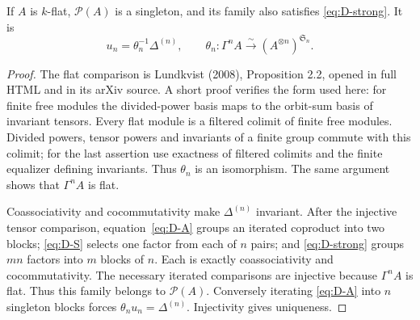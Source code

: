 \begin{theorem}
\label{sa08:D008}
If $A$ is $k$-flat, $\mathcal P(A)$ is a singleton, and its family
also satisfies \eqref{eq:D-strong}. It is
\[
 u_n=\theta_n^{-1}\Delta^{(n)},\qquad
 \theta_n:\Gamma^nA\xrightarrow{\sim}(A^{\otimes n})^{\mathfrak S_n}.
\]
\end{theorem}
\begin{proof}
The flat comparison is Lundkvist (2008), Proposition 2.2, opened
in full HTML and in its arXiv source. A short proof verifies the
form used here: for finite free modules the divided-power basis
maps to the orbit-sum basis of invariant tensors. Every flat
module is a filtered colimit of finite free modules. Divided powers,
tensor powers and invariants of a finite group commute with this
colimit; for the last assertion use exactness of filtered colimits
and the finite equalizer defining invariants. Thus $\theta_n$ is
an isomorphism. The same argument shows that $\Gamma^nA$ is flat.

Coassociativity and cocommutativity make $\Delta^{(n)}$ invariant.
After the injective tensor comparison, equation~\eqref{eq:D-A}
groups an iterated coproduct into two blocks;
\eqref{eq:D-S} selects one factor from each of $n$ pairs; and
\eqref{eq:D-strong} groups $mn$ factors into $m$ blocks of $n$.
Each is exactly coassociativity and cocommutativity. The necessary
iterated comparisons are injective because $\Gamma^nA$ is flat.
Thus this family belongs to $\mathcal P(A)$. Conversely iterating
\eqref{eq:D-A} into $n$ singleton blocks forces
$\theta_nu_n=\Delta^{(n)}$. Injectivity gives uniqueness.
\end{proof}

